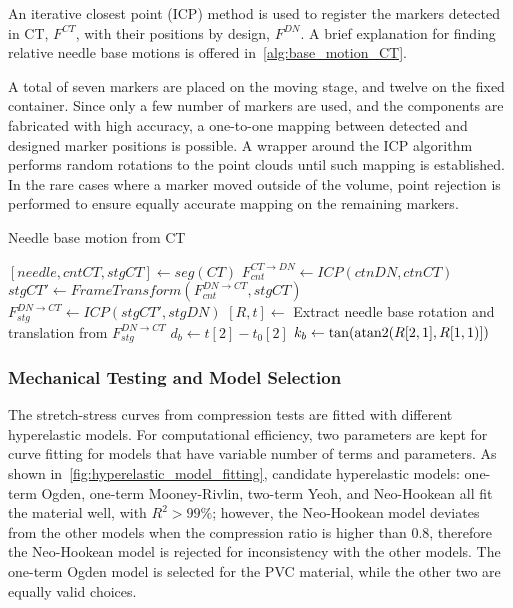 An iterative closest point (ICP) method is used to register the markers detected in CT, $F^{CT}$, with their positions by design, $F^{DN}$. A brief explanation for finding relative needle base motions is offered in~\cref{alg:base_motion_CT}.

A total of seven markers are placed on the moving stage, and twelve on the fixed container. Since only a few number of markers are used, and the components are fabricated with high accuracy, a one-to-one mapping between detected and designed marker positions is possible. A wrapper around the ICP algorithm performs random rotations to the point clouds until such mapping is established. In the rare cases where a marker moved outside of the volume, point rejection is performed to ensure equally accurate mapping on the remaining markers.

\begin{algorithm}
  \caption{Needle base motion from CT}
  \label{alg:base_motion_CT}
  \begin{algorithmic}[1]
    \State $[needle, cntCT, stgCT] \gets seg(CT)$  
    \State $F_{cnt}^{CT \to DN} \gets ICP(ctnDN, ctnCT)$ 
    \State $stgCT' \gets FrameTransform(F_{cnt}^{DN \to CT}, stgCT)$ 
    \State $F_{stg}^{DN \to CT} \gets ICP(stgCT', stgDN)$ 
    \State $[R, t] \gets$ Extract needle base rotation and translation from $F_{stg}^{DN \to CT}$
    \State $d_b \gets t[2] - t_0[2]$
    \State $k_b \gets \tan(\operatorname{atan2}(R[2, 1], R[1, 1)])$ 
  \end{algorithmic}
\end{algorithm}

\subsubsection{Mechanical Testing and Model Selection}
\label{sec:chap-3-mechanical-testing-and-model-selection}

The stretch-stress curves from compression tests are fitted with different hyperelastic models. For computational efficiency, two parameters are kept for curve fitting for models that have variable number of terms and parameters. As shown in~\cref{fig:hyperelastic_model_fitting}, candidate hyperelastic models: one-term Ogden, one-term Mooney-Rivlin, two-term Yeoh, and Neo-Hookean all fit the material well, with $R^2 > 99\%$; however, the Neo-Hookean model deviates from the other models when the compression ratio is higher than 0.8, therefore the Neo-Hookean model is rejected for inconsistency with the other models. The one-term Ogden model is selected for the PVC material, while the other two are equally valid choices.


